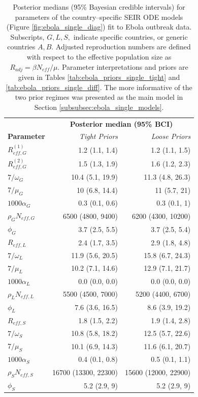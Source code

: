 \begin{table}[htbp]
	\caption[Posterior parameter estimates for country--specific SEIR ODE models fit Ebola outbreak data.]{Posterior medians (95\% Bayesian credible intervals) for parameters of the country--specific SEIR ODE models (Figure \ref{fig:ebola_single_diag}) fit to Ebola outbreak data. Subscripts, $ G,L,S, $ indicate specific countries, or generic countries $ A,B $. Adjusted reproduction numbers are defined with respect to the effective population size as $ R_{adj} = \beta N_{eff} /\mu $. Parameter interpretations and priors are given in Tables \ref{tab:ebola_priors_single_tight} and \ref{tab:ebola_priors_single_diff}. The more informative of the two prior regimes was presented as the main model in Section \ref{subsubsec:ebola_single_models}.}
	\label{tab:ebola_single_ests_ode}
	\centering\footnotesize
	\begin{tabular}{lrr}
		\hline
		& \multicolumn{2}{c}{\textbf{Posterior median (95\% BCI)}}\\\cline{2-3}
		\textbf{Parameter} & \textit{Tight Priors} & \textit{Loose Priors} \\ 
		\hline
		$ R_{eff,G}^{(1)} $& 1.2 (1.1, 1.4) & 1.2 (1.1, 1.5) \\  
		$ R_{eff,G}^{(2)} $&1.5 (1.3, 1.9) & 1.6 (1.2, 2.3) \\ 
		$ 7/\omega_G $& 10.4 (5.1, 19.9) & 11.3 (4.8, 26.3) \\ 
		$ 7/\mu_G $& 10 (6.8, 14.4) & 11 (5.7, 21) \\ 
		$ 1000\alpha_{G} $&  0.3 (0.1, 0.6) & 0.3 (0.1, 1) \\ 
		$ \rho_GN_{eff,G} $& 6500 (4800, 9400) & 6200 (4300, 10200) \\
		$ \phi_{G} $& 3.7 (2.5, 5.5) & 3.7 (2.5, 5.4) \\ 
		\hline
		$ R_{eff,L} $& 2.4 (1.7, 3.5) & 2.9 (1.8, 4.8) \\ 
		$ 7/\omega_L $& 11.9 (5.6, 20.5) & 15.8 (6.7, 24.3) \\ 
		$ 7/\mu_L $&  10.2 (7.1, 14.6) & 12.9 (7.1, 21.7) \\ 
		$ 1000\alpha_L $& 0.0 (0.0, 0.0) & 0.0 (0.0, 0.0) \\ 
		$ \rho_LN_{eff,L} $& 5500 (4500, 7000) & 5200 (4400, 6700) \\ 
		$ \phi_L $&7.6 (3.6, 16.5) & 8.6 (3.9, 19.2) \\ 
		\hline
		$ R_{eff,S} $& 1.8 (1.5, 2.2) & 1.9 (1.4, 2.8) \\
		$ 7/\omega_S $& 10.8 (5.8, 18.2) & 12.5 (5.7, 22.6) \\ 
		$ 7/\mu_S $& 10.1 (6.9, 14.3) & 11.6 (6.1, 20.7) \\ 
		$ 1000\alpha_S $& 0.4 (0.1, 0.8) & 0.5 (0.1, 1.1) \\ 
		$ \rho_SN_{eff,S} $&  16700 (13300, 22300) & 15600 (12000, 22900) \\ 
		$ \phi_S $& 5.2 (2.9, 9) & 5.2 (2.9, 9) \\ 
		\hline
	\end{tabular}
\end{table}

